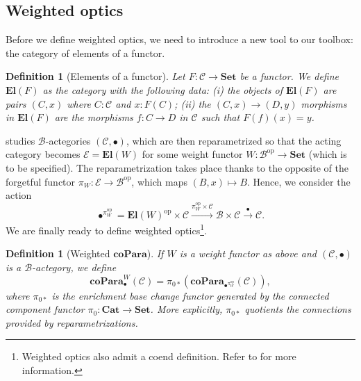 \documentclass[11pt,a4paper,openright,twoside]{report}
\newcounter{mycounter}
\theoremstyle{plain}
\newtheorem{definition}[mycounter]{Definition}
\theoremstyle{definition}
\begin{document}
\subsection{Weighted optics}

Before we define weighted optics, we need to introduce a new tool to our toolbox: the category of elements of a functor.

\begin{definition}[Elements of a functor]
  Let $F: \mathcal{C} \to \mathbf{Set}$ be a functor. We define $\mathbf{El}(F)$ as the category with the following data: (i) the objects of $\mathbf{El}(F)$ are pairs $(C, x)$ where $C : \mathcal{C}$ and $x : F(C)$; (ii) the $(C, x) \to (D, y)$ morphisms in $\mathbf{El}(F)$ are the morphisms $f: C \to D$ in $\mathcal{C}$ such that $F(f)(x) = y$.
\end{definition}

\cite{gavranovic2024fundamental} studies $\mathcal{B}$-actegories $(\mathcal{C}, \bullet)$, which are then reparametrized so that the acting category becomes $\mathcal{E} = \mathbf{El}(W)$ for some weight functor $W: \mathcal{B}^{\mathrm{op}} \to \mathbf{Set}$ (which is to be specified). The reparametrization takes place thanks to the opposite of the forgetful functor $\pi_W: \mathcal{E} \to \mathcal{B}^{\mathrm{op}}$, which maps $(B,x) \mapsto B$. Hence, we consider the action
\[\bullet^{\pi_W^{\mathrm{op}}} = \mathbf{El}(W)^{\mathrm{op}} \times \mathcal{C} \stackrel{\pi_W^{\mathrm{op}} \times \mathcal{C}}{\longrightarrow} \mathcal{B} \times \mathcal{C} \stackrel{\bullet}{\longrightarrow} \mathcal{C}.\]
We are finally ready to define weighted optics\footnote{Weighted optics also admit a coend definition. Refer to \cite{gavranovic2024fundamental} for more information.}.

\begin{definition}[Weighted $\mathbf{coPara}$]
  If $W$ is a weight functor as above and $(\mathcal{C}, \bullet)$ is a $\mathcal{B}$-actegory, we define
  \[\mathbf{coPara}^W_{\bullet}(\mathcal{C}) = \pi_{0*}(\mathbf{coPara}_{\bullet^{\pi_W^{\mathrm{op}}}}(\mathcal{C})),\]
  where $\pi_{0*}$ is the enrichment base change functor generated by the connected component functor $\pi_{0}: \mathbf{Cat} \to \mathbf{Set}$. More explicitly, $\pi_{0*}$ quotients the connections provided by reparametrizations.
\end{definition}
\end{document}
